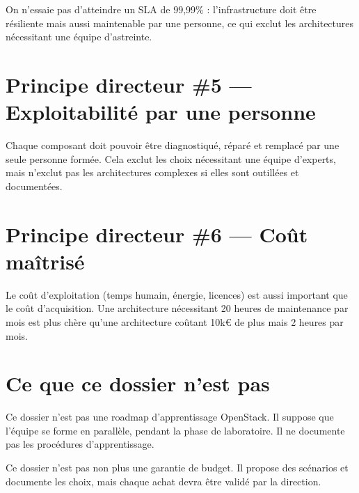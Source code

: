 On n'essaie pas d'atteindre un SLA de 99,99\% : l'infrastructure doit être résiliente mais aussi maintenable par une personne, ce qui exclut les architectures nécessitant une équipe d'astreinte.

\section{Principe directeur \#5 — Exploitabilité par une personne}
Chaque composant doit pouvoir être diagnostiqué, réparé et remplacé par une seule personne formée. Cela exclut les choix nécessitant une équipe d'experts, mais n'exclut pas les architectures complexes si elles sont outillées et documentées.

\section{Principe directeur \#6 — Coût maîtrisé}
Le coût d'exploitation (temps humain, énergie, licences) est aussi important que le coût d'acquisition. Une architecture nécessitant 20 heures de maintenance par mois est plus chère qu'une architecture coûtant 10k€ de plus mais 2 heures par mois.

\section{Ce que ce dossier n'est pas}
Ce dossier n'est pas une roadmap d'apprentissage OpenStack. Il suppose que l'équipe se forme en parallèle, pendant la phase de laboratoire. Il ne documente pas les procédures d'apprentissage.

Ce dossier n'est pas non plus une garantie de budget. Il propose des scénarios et documente les choix, mais chaque achat devra être validé par la direction.